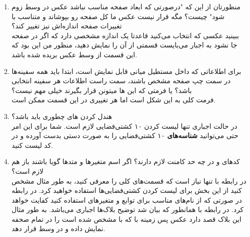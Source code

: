 \documentclass[../main.tex]{subfiles}
\begin{document}
\begin{enumerate}
  \item منظورتان از این که "درصورتی که ابعاد صفحه مناسب نباشد عکس در وسط زوم شود" چیست؟ مگه قرار نیست عکس ما کل صفحه رو بپوشاند و متناسب با تغییرات صفحه اندازه‌اش نیز تغییر کند؟\\
        ببینید عکسی که انتخاب می‌کنید قاعدتا یک اندازه مشخصی دارد که اگر در صفحه جا نشود به اجبار می‌بایست قسمتی از آن را نمایش دهید، منظور من این بود که این قسمت از وسط عکس بریده شده باشد.
  \item برای اطلاعاتی که داخل مستطیل میانی قابل نمایش است، ابتدا باید همه سفینه‌ها در سمت چپ صفحه مشخص باشند، سمت راست اطلاعات هر سفینه انتخابی باشد؟ یا فرمتی که این ها میتونن قرار بگیرند خیلی مهم نیست؟\\
        فرمت کلی به این شکل است اما هر تغییری در این قسمت ممکن است.
  \item هندل کردن ‌های  چطوری باید باشد؟\\
        در حالت اجباری تنها لیست کردن ۱۰ کشتی‌فضایی لازم است. شما برای این امر حتی می‌توانید \textbf{شناسه‌های} ۱۰ کشتی‌فضایی را به صورت دستی بدست آورده و در کد لیست کنید.
  \item کدهای  و  در چه حد کامنت لازم دارند؟ اگر اسم متغیرها و متدها گویا باشند باز هم لازم است؟\\
        در رابطه با  تنها نیاز است که قسمت‌های کلی را معرفی کنید، به طور مثال مشخص کنید از این بخش برای لیست کردن کشتی‌فضایی‌ها استفاده خواهید کرد. در رابطه  در صورتی که از نام‌های مناسب برای توابع و متغیرهای استفاده کنید کفایت خواهد کرد. در رابطه با  همانطور که بیان شد توضیح بلاک‌ها اجباری می‌باشد. به طور مثال این بلاک قصد دارد عکس پس زمینه با که با  مشخص شده است را در تمام صحفه نمایش داده و در وسط قرار دهد.
\end{enumerate}
\end{document}
